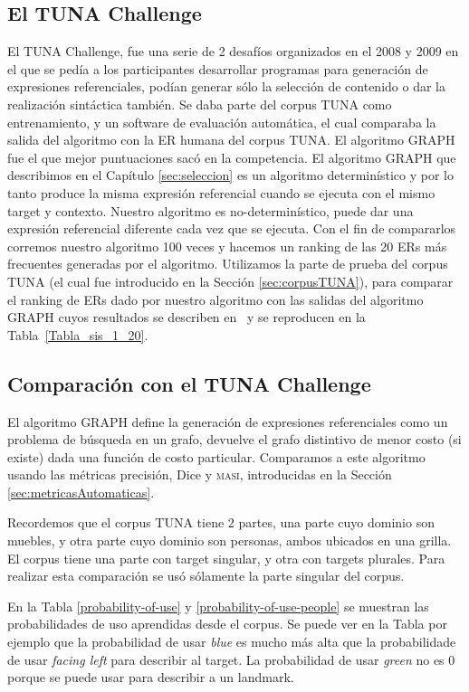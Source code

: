 \subsection{El TUNA Challenge}
El TUNA Challenge, fue una serie de 2 desaf\'ios organizados en el 2008 y 2009 en el que se ped\'ia a los participantes desarrollar programas para generaci\'on de expresiones referenciales, pod\'ian generar s\'olo la selecci\'on de contenido o dar la realizaci\'on sint\'actica tambi\'en.
Se daba parte del corpus TUNA como entrenamiento, y un software de evaluaci\'on autom\'atica, el cual comparaba la salida del algoritmo con la ER humana del corpus TUNA. El algoritmo GRAPH fue el que mejor puntuaciones sac\'o en la competencia.
El algoritmo GRAPH que describimos en el Cap\'itulo \ref{sec:seleccion} es un algoritmo determin\'istico y por lo tanto produce la misma expresi\'on referencial cuando se ejecuta con el mismo target y contexto. Nuestro algoritmo es no-determin\'istico, puede dar una expresi\'on referencial diferente cada vez que se ejecuta. Con el fin de compararlos corremos nuestro algoritmo 100 veces y hacemos un ranking de las 20 ERs m\'as frecuentes generadas por el algoritmo. Utilizamos la parte de prueba del corpus TUNA (el cual fue introducido en la Secci\'on \ref{sec:corpusTUNA}), para comparar el ranking de ERs dado por nuestro algoritmo con las salidas del algoritmo GRAPH cuyos resultados se describen en~\cite{KrahmerGRAPH} y se reproducen en la Tabla~\ref{Tabla_sis_1_20}.


\subsection{Comparaci\'on con el TUNA Challenge}
El algoritmo GRAPH define la generaci\'on de expresiones referenciales como un problema de b\'usqueda en un grafo, devuelve el grafo distintivo de menor costo (si existe) dada una funci\'on de costo particular. Comparamos a este algoritmo usando las m\'etricas precisi\'on, Dice y \textsc {masi}, introducidas en la Secci\'on \ref{sec:metricasAutomaticas}. 

Recordemos que el corpus TUNA tiene 2 partes, una parte cuyo dominio son muebles, y otra parte cuyo dominio son personas, ambos ubicados en una grilla. El corpus tiene una parte con target singular, y otra con targets plurales. Para realizar esta comparaci\'on se us\'o s\'olamente la parte singular del corpus.


En la Tabla \ref{probability-of-use} y \ref{probability-of-use-people} se muestran las probabilidades de uso aprendidas desde el corpus. Se puede ver en la Tabla \label{probability-of-use} por ejemplo que la probabilidad de usar {\it blue} es mucho m\'as alta que la probabilidade de usar {\it facing left} para describir al target. La probabilidad de usar {\it green} no es 0 porque se puede usar para describir a un landmark.

